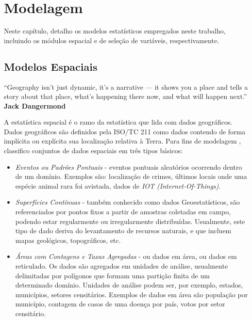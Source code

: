 \chapter{Modelagem}\label{chap:modelagem}

Neste capítulo, detalho os modelos estatísticos empregados neste trabalho, incluindo os módulos espacial e de seleção de variáveis, respectivamente.

\section{Modelos Espaciais}\label{sec:spatial}

\begin{citacao}[english]
{\small ``Geography isn’t just dynamic, it’s a narrative — it shows you a place and tells a story about that place, what’s happening there now, and what will happen next.''\\
\textbf{Jack Dangermond}}
\end{citacao}
A estatística espacial é o ramo da estatística que lida com dados geográficos. Dados geográficos são definidos pela ISO/TC 211 \cite{ISOTC}  como dados contendo de forma implícita ou explícita sua localização relativa à Terra. Para fins de modelagem \cite{Camara2004}, classifico conjuntos de dados espaciais em três tipos básicos:

\begin{itemize}
    \item \textit{Eventos ou Padrões Pontuais} - eventos pontuais aleatórios ocorrendo dentro de um domínio. Exemplos são: localização de crimes, últimos locais onde uma espécie animal rara foi avistada, dados de \textit{IOT (Internet-Of-Things)}.
    \item \textit{Superfícies Contínuas} - também conhecido como dados Geoestatísticos, são referenciados por pontos fixos a partir de amostras coletadas em campo, podendo estar regularmente ou irregularmente distribuídas. Usualmente, este tipo de dado deriva do levantamento de recursos naturais, e que incluem mapas geológicos, topográficos, etc.
    \item \textit{Áreas com Contagens e Taxas Agregadas} - ou dados em área, ou dados em reticulado. Os dados são agregados em unidades de análise, usualmente delimitadas por polígonos que formam uma partição finita de um determinado domínio. Unidades de análise podem ser, por exemplo, estados, municípios, setores censitários. Exemplos de dados em área são população por município, contagem de casos de uma doença por país, votos por setor censitário.
\end{itemize}

